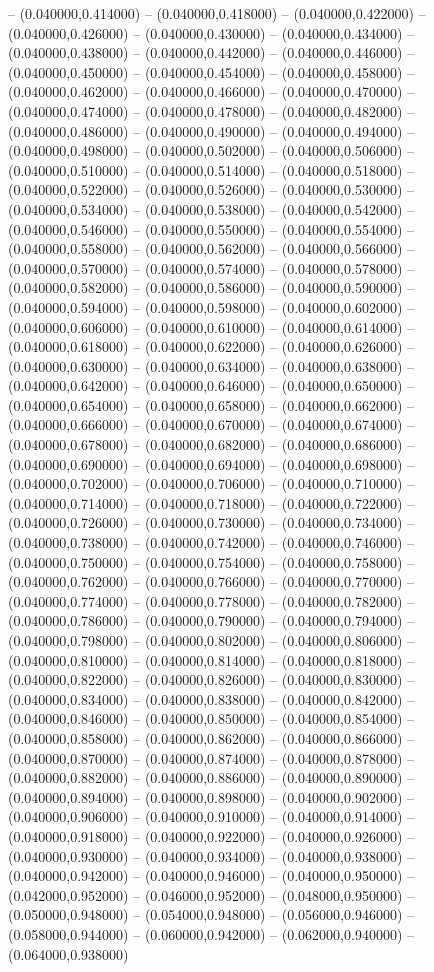 -- (0.040000,0.414000) -- (0.040000,0.418000) -- (0.040000,0.422000) -- (0.040000,0.426000) -- (0.040000,0.430000) -- (0.040000,0.434000) -- (0.040000,0.438000) -- (0.040000,0.442000) -- (0.040000,0.446000) -- (0.040000,0.450000) -- (0.040000,0.454000) -- (0.040000,0.458000) -- (0.040000,0.462000) -- (0.040000,0.466000) -- (0.040000,0.470000) -- (0.040000,0.474000) -- (0.040000,0.478000) -- (0.040000,0.482000) -- (0.040000,0.486000) -- (0.040000,0.490000) -- (0.040000,0.494000) -- (0.040000,0.498000) -- (0.040000,0.502000) -- (0.040000,0.506000) -- (0.040000,0.510000) -- (0.040000,0.514000) -- (0.040000,0.518000) -- (0.040000,0.522000) -- (0.040000,0.526000) -- (0.040000,0.530000) -- (0.040000,0.534000) -- (0.040000,0.538000) -- (0.040000,0.542000) -- (0.040000,0.546000) -- (0.040000,0.550000) -- (0.040000,0.554000) -- (0.040000,0.558000) -- (0.040000,0.562000) -- (0.040000,0.566000) -- (0.040000,0.570000) -- (0.040000,0.574000) -- (0.040000,0.578000) -- (0.040000,0.582000) -- (0.040000,0.586000) -- (0.040000,0.590000) -- (0.040000,0.594000) -- (0.040000,0.598000) -- (0.040000,0.602000) -- (0.040000,0.606000) -- (0.040000,0.610000) -- (0.040000,0.614000) -- (0.040000,0.618000) -- (0.040000,0.622000) -- (0.040000,0.626000) -- (0.040000,0.630000) -- (0.040000,0.634000) -- (0.040000,0.638000) -- (0.040000,0.642000) -- (0.040000,0.646000) -- (0.040000,0.650000) -- (0.040000,0.654000) -- (0.040000,0.658000) -- (0.040000,0.662000) -- (0.040000,0.666000) -- (0.040000,0.670000) -- (0.040000,0.674000) -- (0.040000,0.678000) -- (0.040000,0.682000) -- (0.040000,0.686000) -- (0.040000,0.690000) -- (0.040000,0.694000) -- (0.040000,0.698000) -- (0.040000,0.702000) -- (0.040000,0.706000) -- (0.040000,0.710000) -- (0.040000,0.714000) -- (0.040000,0.718000) -- (0.040000,0.722000) -- (0.040000,0.726000) -- (0.040000,0.730000) -- (0.040000,0.734000) -- (0.040000,0.738000) -- (0.040000,0.742000) -- (0.040000,0.746000) -- (0.040000,0.750000) -- (0.040000,0.754000) -- (0.040000,0.758000) -- (0.040000,0.762000) -- (0.040000,0.766000) -- (0.040000,0.770000) -- (0.040000,0.774000) -- (0.040000,0.778000) -- (0.040000,0.782000) -- (0.040000,0.786000) -- (0.040000,0.790000) -- (0.040000,0.794000) -- (0.040000,0.798000) -- (0.040000,0.802000) -- (0.040000,0.806000) -- (0.040000,0.810000) -- (0.040000,0.814000) -- (0.040000,0.818000) -- (0.040000,0.822000) -- (0.040000,0.826000) -- (0.040000,0.830000) -- (0.040000,0.834000) -- (0.040000,0.838000) -- (0.040000,0.842000) -- (0.040000,0.846000) -- (0.040000,0.850000) -- (0.040000,0.854000) -- (0.040000,0.858000) -- (0.040000,0.862000) -- (0.040000,0.866000) -- (0.040000,0.870000) -- (0.040000,0.874000) -- (0.040000,0.878000) -- (0.040000,0.882000) -- (0.040000,0.886000) -- (0.040000,0.890000) -- (0.040000,0.894000) -- (0.040000,0.898000) -- (0.040000,0.902000) -- (0.040000,0.906000) -- (0.040000,0.910000) -- (0.040000,0.914000) -- (0.040000,0.918000) -- (0.040000,0.922000) -- (0.040000,0.926000) -- (0.040000,0.930000) -- (0.040000,0.934000) -- (0.040000,0.938000) -- (0.040000,0.942000) -- (0.040000,0.946000) -- (0.040000,0.950000) -- (0.042000,0.952000) -- (0.046000,0.952000) -- (0.048000,0.950000) -- (0.050000,0.948000) -- (0.054000,0.948000) -- (0.056000,0.946000) -- (0.058000,0.944000) -- (0.060000,0.942000) -- (0.062000,0.940000) -- (0.064000,0.938000) 